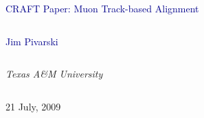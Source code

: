 \documentclass[compress]{beamer}
\begin{document}
\begin{frame}
\vfill
\begin{center}
\textcolor{darkblue}{\Large CRAFT Paper: Muon Track-based Alignment}

\vfill
\begin{columns}
\begin{center}
\large
\textcolor{darkblue}{Jim Pivarski}
\end{center}
\end{columns}

\begin{columns}
\begin{center}
\scriptsize
{\it Texas A\&M University}
\end{center}
\end{columns}

\vfill
21 July, 2009

\end{center}
\end{frame}


\small
\end{document}
